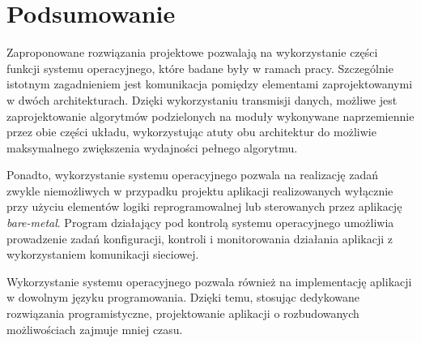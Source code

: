 \section*{Podsumowanie}

Zaproponowane rozwiązania projektowe pozwalają na wykorzystanie części funkcji systemu operacyjnego, które badane były w ramach pracy. 
Szczególnie istotnym zagadnieniem jest komunikacja pomiędzy elementami zaprojektowanymi w dwóch architekturach. 
Dzięki wykorzystaniu transmisji danych, możliwe jest zaprojektowanie algorytmów podzielonych na moduły wykonywane naprzemiennie przez obie części układu, wykorzystując atuty obu architektur do możliwie maksymalnego zwiększenia wydajności pełnego algorytmu.

Ponadto, wykorzystanie systemu operacyjnego pozwala na realizację zadań zwykle niemożliwych w przypadku projektu aplikacji realizowanych wyłącznie przy użyciu elementów logiki reprogramowalnej lub sterowanych przez aplikację \textit{bare-metal}. 
Program działający pod kontrolą systemu operacyjnego umożliwia prowadzenie zadań konfiguracji, kontroli i monitorowania działania aplikacji z wykorzystaniem komunikacji sieciowej.

Wykorzystanie systemu operacyjnego pozwala również na implementację aplikacji w dowolnym języku programowania. 
Dzięki temu, stosując dedykowane rozwiązania programistyczne, projektowanie aplikacji o rozbudowanych możliwościach zajmuje mniej czasu.

